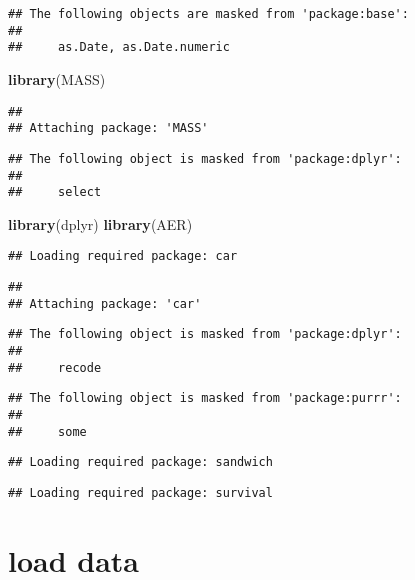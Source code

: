 \documentclass[]{article}
\newenvironment{Shaded}{\begin{snugshade}}{\end{snugshade}}
\newcommand{\KeywordTok}[1]{\textcolor[rgb]{0.13,0.29,0.53}{\textbf{{#1}}}}
\newcommand{\NormalTok}[1]{{#1}}
\begin{document}
\begin{verbatim}
## The following objects are masked from 'package:base':
## 
##     as.Date, as.Date.numeric
\end{verbatim}

\begin{Shaded}
\begin{Highlighting}[]
\KeywordTok{library}\NormalTok{(MASS)}
\end{Highlighting}
\end{Shaded}

\begin{verbatim}
## 
## Attaching package: 'MASS'
\end{verbatim}

\begin{verbatim}
## The following object is masked from 'package:dplyr':
## 
##     select
\end{verbatim}

\begin{Shaded}
\begin{Highlighting}[]
\KeywordTok{library}\NormalTok{(dplyr)}
\KeywordTok{library}\NormalTok{(AER)}
\end{Highlighting}
\end{Shaded}

\begin{verbatim}
## Loading required package: car
\end{verbatim}

\begin{verbatim}
## 
## Attaching package: 'car'
\end{verbatim}

\begin{verbatim}
## The following object is masked from 'package:dplyr':
## 
##     recode
\end{verbatim}

\begin{verbatim}
## The following object is masked from 'package:purrr':
## 
##     some
\end{verbatim}

\begin{verbatim}
## Loading required package: sandwich
\end{verbatim}

\begin{verbatim}
## Loading required package: survival
\end{verbatim}

\section{load data}\label{load-data}
\end{document}
